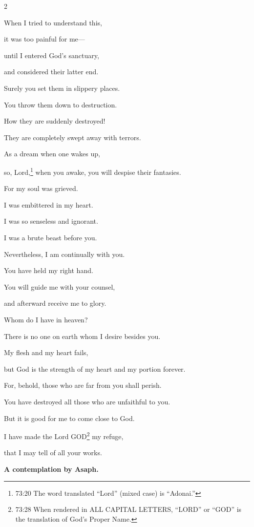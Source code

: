 \begin{multicols}{2}
	
	\myverse{}When I tried to understand this,
	
	it was too painful for me---
	
	
	\myverse{}until I entered God’s sanctuary,
	
	and considered their latter end.
	
	
	\myverse{}Surely you set them in slippery places.
	
	You throw them down to destruction.
	
	
	\myverse{}How they are suddenly destroyed!
	
	They are completely swept away with terrors.
	
	
	\myverse{}As a dream when one wakes up,
	
	so, Lord,\footnote{73:20 The word translated “Lord” (mixed case) is “Adonai.”} when you awake, you will despise
	their fantasies.
	
	
	\myverse{}For my soul was grieved.
	
	I was embittered in my heart.
	
	
	\myverse{}I was so senseless and ignorant.
	
	I was a brute beast before you.
	
	
	\myverse{}Nevertheless, I am continually with you.
	
	You have held my right hand.
	
	
	\myverse{}You will guide me with your counsel,
	
	and afterward receive me to glory.
	
	
	\myverse{}Whom do I have in heaven?
	
	There is no one on earth whom I desire besides you.
	
	
	\myverse{}My flesh and my heart fails,
	
	but God is the strength of my heart and my portion forever.
	
	
	\myverse{}For, behold, those who are far from you shall perish.
	
	You have destroyed all those who are unfaithful to you.
	
	
	\myverse{}But it is good for me to come close to God.
	
	I have made the Lord GOD\footnote{73:28 When rendered in ALL CAPITAL LETTERS, “LORD” or “GOD” is the translation of God’s Proper Name.}
	my refuge,
	
	that I may tell of all your works.
	
	
	
	\mychapter{}\textbf{A contemplation by Asaph.}
	

\end{multicols}
